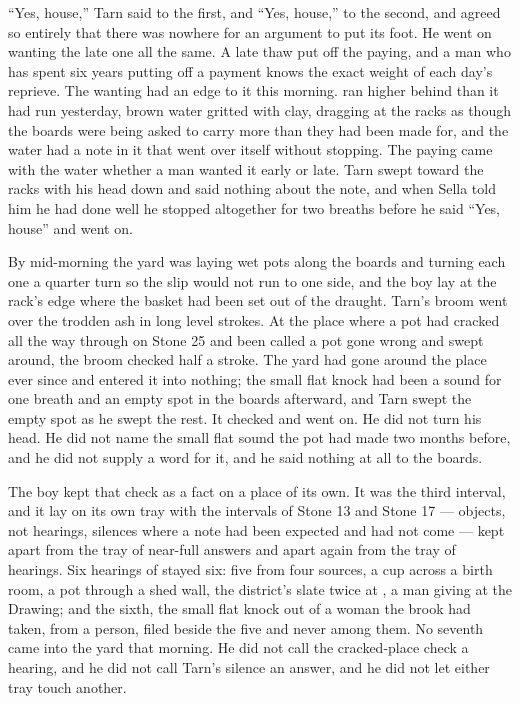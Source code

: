 “Yes, house,” Tarn said to the first, and “Yes, house,” to the second, and agreed so entirely that there was nowhere for an argument to put its foot. He went on wanting the late one all the same. A late thaw put off the paying, and a man who has spent six years putting off a payment knows the exact weight of each day's reprieve. The wanting had an edge to it this morning.  ran higher behind  than it had run yesterday, brown water gritted with clay, dragging at the racks as though the boards were being asked to carry more than they had been made for, and the water had a note in it that went over itself without stopping. The paying came with the water whether a man wanted it early or late. Tarn swept toward the racks with his head down and said nothing about the note, and when Sella told him he had done well he stopped altogether for two breaths before he said “Yes, house” and went on.

By mid-morning the yard was laying wet pots along the boards and turning each one a quarter turn so the slip would not run to one side, and the boy lay at the rack's edge where the basket had been set out of the draught. Tarn's broom went over the trodden ash in long level strokes. At the place where a pot had cracked all the way through on Stone 25 and been called a pot gone wrong and swept around, the broom checked half a stroke. The yard had gone around the place ever since and entered it into nothing; the small flat knock had been a sound for one breath and an empty spot in the boards afterward, and Tarn swept the empty spot as he swept the rest. It checked and went on. He did not turn his head. He did not name the small flat sound the pot had made two months before, and he did not supply a  word for it, and he said nothing at all to the boards.

The boy kept that check as a fact on a place of its own. It was the third interval, and it lay on its own tray with the intervals of Stone 13 and Stone 17 --- objects, not hearings, silences where a note had been expected and had not come --- kept apart from the tray of near-full answers and apart again from the tray of hearings. Six hearings of  stayed six: five from four sources, a cup across a birth room, a pot through a shed wall, the district's slate twice at , a man giving at the Drawing; and the sixth, the small flat knock out of a woman the brook had taken, from a person, filed beside the five and never among them. No seventh came into the yard that morning. He did not call the cracked-place check a hearing, and he did not call Tarn's silence an answer, and he did not let either tray touch another.

